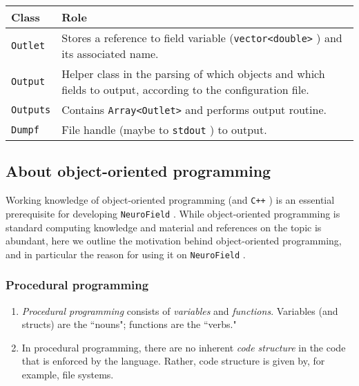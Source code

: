\documentclass[12pt,a4paper]{article}
\newcommand{\type}[1]{{\small\small\tt #1} }
\newcommand{\NF}[0]{\type{NeuroField}}
\begin{document}
\begin{tabular}{l p{16cm}}
	Class&Role\\
	\hline
	\type{Outlet}&Stores a reference to field variable (\type{vector<double>}) and its associated name.\\
	\type{Output}&Helper class in the parsing of which objects and which fields to output, according to the configuration file.\\
	\type{Outputs}&Contains \type{Array<Outlet>} and performs output routine.\\
	\type{Dumpf}&File handle (maybe to \type{stdout}) to output.
\end{tabular}



\subsection{About object-oriented programming}

Working knowledge of object-oriented programming (and \type{C++}) is an essential prerequisite for developing \NF. While object-oriented programming is standard computing knowledge and material and references on the topic is abundant, here we outline the motivation behind object-oriented programming, and in particular the reason for using it on \NF.

\subsubsection{Procedural programming}

\begin{enumerate}

\item \emph{Procedural programming} consists of \emph{variables} and \emph{functions}. Variables (and structs) are the ``nouns"; functions are the ``verbs."

\item In procedural programming, there are no inherent \emph{code structure} in the code that is enforced by the language. Rather, code structure is given by, for example, file systems.
\end{enumerate}
\end{document}
